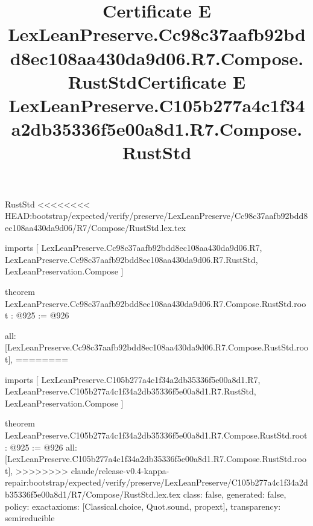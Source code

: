 \begin{lexlean}{RustStd}
<<<<<<<< HEAD:bootstrap/expected/verify/preserve/LexLeanPreserve/Cc98c37aafb92bdd8ec108aa430da9d06/R7/Compose/RustStd.lex.tex
\title{Certificate E LexLeanPreserve.Cc98c37aafb92bdd8ec108aa430da9d06.R7.Compose.RustStd}
\begin{coremodule}
imports [
  LexLeanPreserve.Cc98c37aafb92bdd8ec108aa430da9d06.R7,
  LexLeanPreserve.Cc98c37aafb92bdd8ec108aa430da9d06.R7.RustStd,
  LexLeanPreservation.Compose
]

theorem LexLeanPreserve.Cc98c37aafb92bdd8ec108aa430da9d06.R7.Compose.RustStd.root : @925 := @926 {
  all: [LexLeanPreserve.Cc98c37aafb92bdd8ec108aa430da9d06.R7.Compose.RustStd.root],
========
\title{Certificate E LexLeanPreserve.C105b277a4c1f34a2db35336f5e00a8d1.R7.Compose.RustStd}
\begin{coremodule}
imports [
  LexLeanPreserve.C105b277a4c1f34a2db35336f5e00a8d1.R7,
  LexLeanPreserve.C105b277a4c1f34a2db35336f5e00a8d1.R7.RustStd,
  LexLeanPreservation.Compose
]

theorem LexLeanPreserve.C105b277a4c1f34a2db35336f5e00a8d1.R7.Compose.RustStd.root : @925 := @926 {
  all: [LexLeanPreserve.C105b277a4c1f34a2db35336f5e00a8d1.R7.Compose.RustStd.root],
>>>>>>>> claude/release-v0.4-kappa-repair:bootstrap/expected/verify/preserve/LexLeanPreserve/C105b277a4c1f34a2db35336f5e00a8d1/R7/Compose/RustStd.lex.tex
  class: false,
  generated: false,
  policy: exact{axioms: [Classical.choice, Quot.sound, propext]},
  transparency: semireducible
}


\end{coremodule}}
\end{coremodule}
\end{lexlean}
